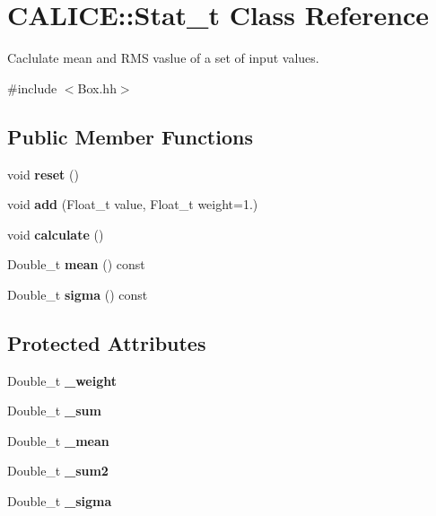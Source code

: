 \section{CALICE::Stat\_\-t Class Reference}
\label{classCALICE_1_1Stat__t}


Caclulate mean and RMS vaslue of a set of input values.  


{\ttfamily \#include $<$Box.hh$>$}\subsection*{Public Member Functions}
\begin{DoxyCompactItemize}
\item 
void {\bfseries reset} ()\label{classCALICE_1_1Stat__t_acf6555a00a6567e5f3bd64b286147105}

\item 
void {\bfseries add} (Float\_\-t value, Float\_\-t weight=1.)\label{classCALICE_1_1Stat__t_a7b345a82593acd04ae8ec24093e60e3b}

\item 
void {\bfseries calculate} ()\label{classCALICE_1_1Stat__t_a3e81369ea9d0f2603dad3a3bb6d20209}

\item 
Double\_\-t {\bfseries mean} () const \label{classCALICE_1_1Stat__t_a324b40b1f06f41039dd0a9d72055f31e}

\item 
Double\_\-t {\bfseries sigma} () const \label{classCALICE_1_1Stat__t_a9a287b6c964273a4d2b246de7a99d7c5}

\end{DoxyCompactItemize}
\subsection*{Protected Attributes}
\begin{DoxyCompactItemize}
\item 
Double\_\-t {\bfseries \_\-weight}\label{classCALICE_1_1Stat__t_a770e755b2931194f594656e1e5cb7834}

\item 
Double\_\-t {\bfseries \_\-sum}\label{classCALICE_1_1Stat__t_af46eefdce2686e0d5d94fe9361a404df}

\item 
Double\_\-t {\bfseries \_\-mean}\label{classCALICE_1_1Stat__t_a4793d99948d5879898302766cfa1f122}

\item 
Double\_\-t {\bfseries \_\-sum2}\label{classCALICE_1_1Stat__t_a9940d9384886fc045c90457759225bbc}

\item 
Double\_\-t {\bfseries \_\-sigma}\label{classCALICE_1_1Stat__t_a2594c72a5f89186db65cf86195edec43}

\end{DoxyCompactItemize}
